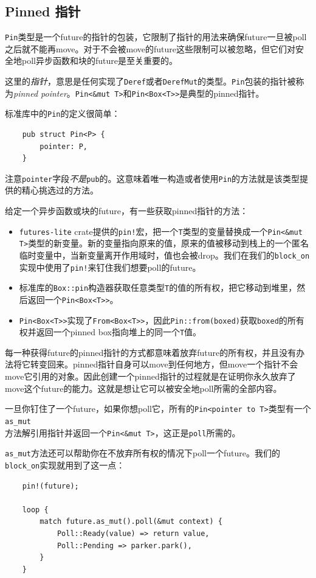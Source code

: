 \subsection{Pinned 指针}
\texttt{Pin}类型是一个future的指针的包装，它限制了指针的用法来确保future一旦被poll之后就不能再move。对于不会被move的future这些限制可以被忽略，但它们对安全地poll异步函数和块的future是至关重要的。

这里的\emph{指针}，意思是任何实现了\texttt{Deref}或者\texttt{DerefMut}的类型。\texttt{Pin}包装的指针被称为\emph{pinned pointer}。\texttt{Pin<\&mut T>}和\texttt{Pin<Box<T>>}是典型的pinned指针。

标准库中的\texttt{Pin}的定义很简单：
\begin{verbatim}
    pub struct Pin<P> {
        pointer: P,
    }
\end{verbatim}

注意\texttt{pointer}字段\emph{不是}\texttt{pub}的。这意味着唯一构造或者使用\texttt{Pin}的方法就是该类型提供的精心挑选过的方法。

给定一个异步函数或块的future，有一些获取pinned指针的方法：
\begin{itemize}
    \item \texttt{futures-lite} crate提供的\texttt{pin!}宏，把一个\texttt{T}类型的变量替换成一个\texttt{Pin<\&mut T>}类型的新变量。新的变量指向原来的值，原来的值被移动到栈上的一个匿名临时变量中，当新变量离开作用域时，值也会被drop。我们在我们的\texttt{block\_on}实现中使用了\texttt{pin!}来钉住我们想要poll的future。
    \item 标准库的\texttt{Box::pin}构造器获取任意类型\texttt{T}的值的所有权，把它移动到堆里，然后返回一个\texttt{Pin<Box<T>>}。
    \item \texttt{Pin<Box<T>>}实现了\texttt{From<Box<T>>}，因此\texttt{Pin::from(boxed)}获取\texttt{boxed}的所有权并返回一个pinned box指向堆上的同一个\texttt{T}值。
\end{itemize}

每一种获得future的pinned指针的方式都意味着放弃future的所有权，并且没有办法将它转变回来。pinned指针自身可以move到任何地方，但move一个指针不会move它引用的对象。因此创建一个pinned指针的过程就是在证明你永久放弃了move这个future的能力。这就是想让它可以被安全地poll所需的全部内容。

一旦你钉住了一个future，如果你想poll它，所有的\texttt{Pin<pointer to T>}类型有一个\texttt{as\_mut}\\
方法解引用指针并返回一个\texttt{Pin<\&mut T>}，这正是\texttt{poll}所需的。

\texttt{as\_mut}方法还可以帮助你在不放弃所有权的情况下poll一个future。我们的\texttt{block\_on}实现就用到了这一点：
\begin{verbatim}
    pin!(future);

    loop {
        match future.as_mut().poll(&mut context) {
            Poll::Ready(value) => return value,
            Poll::Pending => parker.park(),
        }
    }
\end{verbatim}


